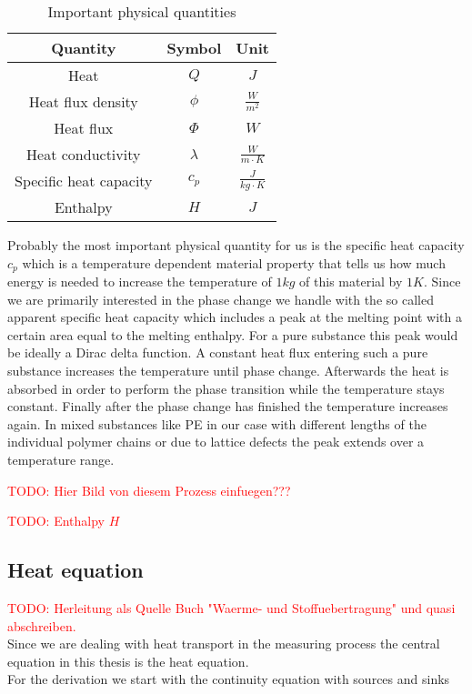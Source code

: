 \documentclass{scrartcl}[12pt, halfparskip]
\newcommand{\todo}[1]{\textcolor{red}{TODO: #1}}
\begin{document}
\begin{table}[H]
	\centering
\begin{tabular}{| c | c | c |} \hline
	Quantity & Symbol & Unit \\ \hline
	Heat & $Q$ & $J$ \\[0.7ex]
	Heat flux density & $\phi$ & $\frac{W}{m^2}$ \\[0.7ex]
	Heat flux & $\varPhi$ & $W$ \\[0.7ex]
	Heat conductivity & $\lambda$ & $\frac{W}{m \cdot K}$ \\[0.7ex]
	Specific heat capacity & $c_p$ & $\frac{J}{kg \cdot K}$ \\[0.7ex]
	Enthalpy & $H$ & $J$ \\ \hline
\end{tabular}
\caption{Important physical quantities}
\label{tab:important_physical_quantities}
\end{table}



Probably the most important physical quantity for us is the specific heat capacity $c_p$ which is a temperature dependent material property that tells us how much energy is needed to increase the temperature of $1kg$ of this material by $1K$. Since we are primarily interested in the phase change we handle with the so called apparent specific heat capacity which includes a peak at the melting point with a certain area equal to the melting enthalpy. For a pure substance this peak would be ideally a Dirac delta function. A constant heat flux entering such a pure substance increases the temperature until phase change. Afterwards the heat is absorbed in order to perform the phase transition while the temperature stays constant. Finally after the phase change has finished the temperature increases again. In mixed substances like PE in our case with different lengths of the individual polymer chains or due to lattice defects the peak extends over a temperature range.

\todo{Hier Bild von diesem Prozess einfuegen???} 

\todo{Enthalpy $H$}


\subsection{Heat equation}
\label{sec:heat_equation}
\todo{Herleitung als Quelle Buch "Waerme- und Stoffuebertragung" \cite{lit:waerme_und_stoffuebertragung} und quasi abschreiben.} \\
Since we are dealing with heat transport in the measuring process the central equation in this thesis is the heat equation. \\
For the derivation we start with the continuity equation with sources and sinks
\end{document}
